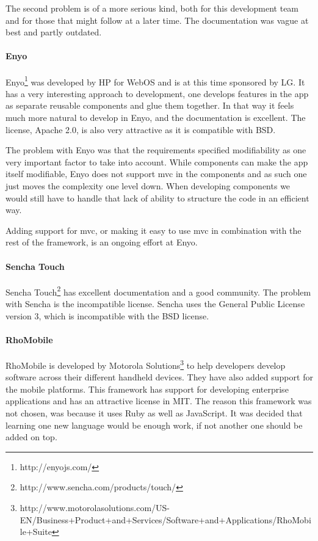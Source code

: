 \documentclass[11pt]{book}
\begin{document}
The second problem is of a more serious kind, both for this development team and for those that might follow at a later time. The documentation was vague at best and partly outdated.

\paragraph{Enyo}
Enyo\footnote{http://enyojs.com/} was developed by HP for WebOS\cite{enyoHistory} and is at this time sponsored by LG. It has a very interesting approach to development, one develops features in the app as separate reusable components and glue them together. In that way it feels much more natural to develop in Enyo, and the documentation is excellent. The license, Apache 2.0, is also very attractive as it is compatible with BSD.

The problem with Enyo was that the requirements specified modifiability as one very important factor to take into account. While components can make the app itself modifiable, Enyo does not support \gls{mvc} in the components and as such one just moves the complexity one level down. When developing components we would still have to handle that lack of ability to structure the code in an efficient way.

Adding support for \gls{mvc}, or making it easy to use \gls{mvc} in combination with the rest of the framework, is an ongoing effort at Enyo.

\paragraph{Sencha Touch}
Sencha Touch\footnote{http://www.sencha.com/products/touch/} has excellent documentation and a good community. The problem with Sencha is the incompatible license. Sencha uses the General Public License version 3, which is incompatible with the BSD license.\cite{flossLicense}

\paragraph{RhoMobile}
RhoMobile is developed by Motorola Solutions\footnote{http://www.motorolasolutions.com/US-EN/Business+Product+and+Services/Software+and+Applications/RhoMobile+Suite} to help developers develop software across their different handheld devices. They have also added support for the mobile platforms. This framework has support for developing enterprise applications and has an attractive license in MIT.
The reason this framework was not chosen, was because it uses Ruby as well as JavaScript. It was decided that learning one new language would be enough work, if not another one should be added on top.
\end{document}
